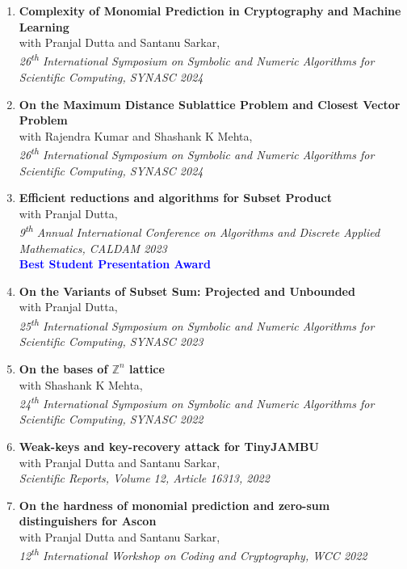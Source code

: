 \documentclass[margin]{res} %
\begin{document}
\begin{resume}
\begin{enumerate}
\item \textbf{Complexity of Monomial Prediction in Cryptography and Machine Learning}\\
with Pranjal Dutta and Santanu Sarkar,\\
\emph{26\textsuperscript{th} International Symposium on Symbolic and Numeric Algorithms for Scientific Computing, SYNASC 2024}

\item \textbf{On the Maximum Distance Sublattice Problem and Closest Vector Problem}\\
with Rajendra Kumar and Shashank K Mehta,\\
\emph{26\textsuperscript{th} International Symposium on Symbolic and Numeric Algorithms for Scientific Computing, SYNASC 2024}

\item \textbf{Efficient reductions and algorithms
for Subset Product}\\
with Pranjal Dutta,\\
\emph{9\textsuperscript{th}  Annual International Conference on Algorithms and Discrete Applied Mathematics, CALDAM 2023}\\
\textbf{\textcolor{blue}{Best Student Presentation Award}}

\item \textbf{On the Variants of Subset Sum: Projected and Unbounded}\\
with Pranjal Dutta,\\
\emph{25\textsuperscript{th} International Symposium on Symbolic and Numeric Algorithms for Scientific Computing, SYNASC 2023}

\item \textbf{On the bases of $\mathbb{Z}^n$ lattice}\\
with Shashank K Mehta,\\
\emph{24\textsuperscript{th} International Symposium on Symbolic and Numeric Algorithms for Scientific Computing, SYNASC 2022}

\item \textbf{Weak-keys and key-recovery attack for TinyJAMBU}\\
with Pranjal Dutta and Santanu Sarkar,\\
\emph{Scientific Reports, Volume 12, Article 16313, 2022}

\item \textbf{On the hardness of monomial prediction and zero-sum distinguishers for Ascon}\\
with Pranjal Dutta and Santanu Sarkar,\\
\emph{12\textsuperscript{th} International Workshop on Coding and Cryptography, WCC 2022}


\end{enumerate}
\end{resume}
\end{document}
